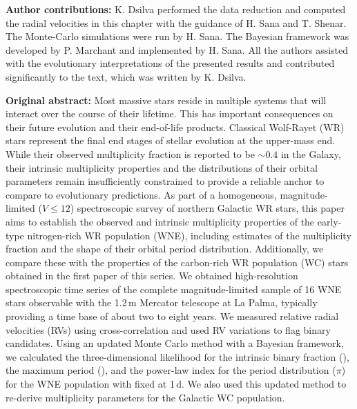 \textbf{Author contributions:} K. Dsilva performed the data reduction and computed the radial velocities in this chapter with the guidance of H. Sana and T. Shenar. The Monte-Carlo simulations were run by H. Sana. The Bayesian framework was developed by P. Marchant and implemented by H. Sana. All the authors assisted with the evolutionary interpretations of the presented results and contributed significantly to the text, which was written by K. Dsilva.
\newpage
\begin{abs}
\vspace{3mm}
\textbf{Original abstract:}
\newline \newline
Most massive stars reside in multiple systems that will interact over the course of their lifetime. This has important consequences on their future evolution and their end-of-life products. Classical Wolf-Rayet (WR) stars represent the final end stages of stellar evolution at the upper-mass end. While their observed multiplicity fraction is reported to be ${\sim}0.4$ in the Galaxy, their intrinsic multiplicity properties and the distributions of their orbital parameters remain insufficiently constrained to provide a reliable anchor to compare to evolutionary predictions.
  \newline \newline%
As part of a homogeneous, magnitude-limited ($V\leq12$) spectroscopic survey of northern Galactic WR stars, this paper aims to establish the observed and intrinsic multiplicity properties of the early-type nitrogen-rich WR population (WNE), including estimates of the multiplicity fraction and the shape of their orbital period distribution. Additionally, we compare these with the properties of the carbon-rich WR population (WC) stars obtained in the first paper of this series.
 \newline \newline%
We obtained high-resolution spectroscopic time series of the complete magnitude-limited sample of 16 WNE stars observable with the 1.2\,m Mercator telescope at La Palma, typically providing a time base of about two to eight years. We measured relative radial velocities (RVs) using cross-correlation and used RV variations to flag binary candidates. Using an updated Monte Carlo method with a Bayesian framework, we calculated the three-dimensional likelihood for the intrinsic binary fraction (\fintWNE{}), the maximum period (\logPmax{}), and the power-law index for the period distribution ($\pi$) for the WNE population with \Pmin{} fixed at 1\,d. We also used this updated method to re-derive multiplicity parameters for the Galactic WC population.
   

\end{abs}
